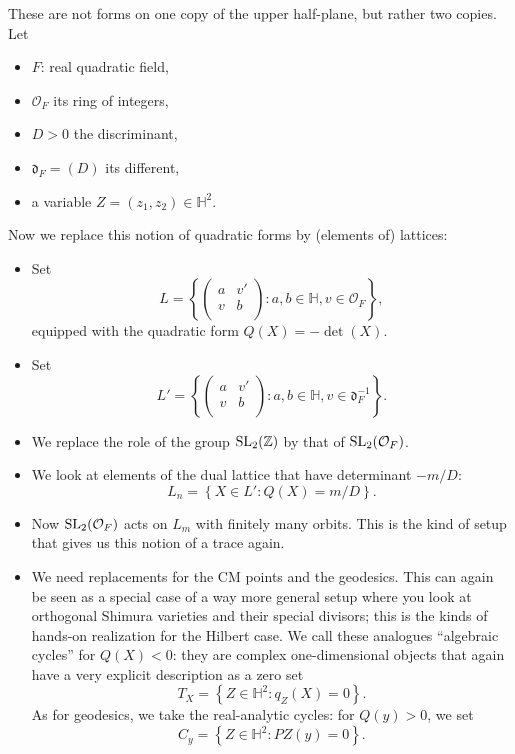 \documentclass[reqno]{amsart} 
\numberwithin{theorem}{section}
\numberwithin{equation}{section}
\begin{document}
These are not forms on one copy of the upper half-plane, but rather two copies.  Let
\begin{itemize}
\item $F$: real quadratic field,
\item $\mathcal{O}_F$ its ring of integers,
\item $D > 0$ the discriminant,
\item $\mathfrak{d}_F =(D)$ its different,
\item a variable $Z =(z_1, z_2) \in \mathbb{H}^2$.
\end{itemize}
Now we replace this notion of quadratic forms by (elements of) lattices:
\begin{itemize}
\item Set
  \begin{equation*}
    L = \left\{
      \begin{pmatrix}
        a        & v' \\
        v & b \\
      \end{pmatrix} : a, b \in \mathbb{H}, v \in \mathcal{O}_F \right\},
  \end{equation*}
  equipped with the quadratic form $Q(X) = - \det(X)$.
\item Set
  \begin{equation*}
    L ' = \left\{
      \begin{pmatrix}
        a        & v' \\
        v & b \\
      \end{pmatrix} : a, b \in \mathbb{H}, v \in \mathfrak{d}_F^{-1} \right\}.
  \end{equation*}
\item We replace the role of the group $\operatorname{SL}_2(\mathbb{Z})$ by that of $\operatorname{SL}_2(\mathcal{O}_F)$.
\item We look at elements of the dual lattice that have determinant $- m / D$:
  \begin{equation*}
    L_n = \left\{ X \in L ' : Q(X) = m / D \right\}.
  \end{equation*}
\item Now $\operatorname{SL}_2(\mathcal{O}_F)$ acts on $L_m$ with finitely many orbits.  This is the kind of setup that gives us this notion of a trace again.  
\item We need replacements for the CM points and the geodesics.  This can again be seen as a special case of a way more general setup where you look at orthogonal Shimura varieties and their special divisors; this is the kinds of hands-on realization for the Hilbert case.  We call these analogues ``algebraic cycles'' for $Q(X) < 0$: they are complex one-dimensional objects that again have a very explicit description as a zero set
  \begin{equation*}
    T_X = \left\{ Z \in \mathbb{H}^2 : q_Z(X) = 0 \right\}.
  \end{equation*}
  As for geodesics, we take the real-analytic cycles: for $Q(y) > 0$, we set
  \begin{equation*}
    C_y = \left\{  Z \in \mathbb{H}^2 : P Z(y) = 0 \right\}.
  \end{equation*}
\end{itemize}
\end{document}
